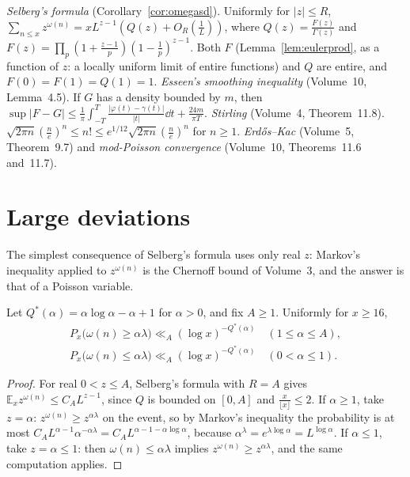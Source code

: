 \begin{reminder}
\emph{Selberg's formula} (Corollary~\ref{cor:omegasd}). Uniformly for $|z|\le R$, $\sum_{n\le x}z^{\omega(n)}=xL^{z-1}(Q(z)+O_R(\frac1L))$, where $Q(z)=\frac{F(z)}{\Gamma(z)}$ and $F(z)=\prod_p(1+\frac{z-1}p)(1-\frac1p)^{z-1}$. Both $F$ (Lemma~\ref{lem:eulerprod}, as a function of $z$: a locally uniform limit of entire functions) and $Q$ are entire, and $F(0)=F(1)=Q(1)=1$.
\emph{Esseen's smoothing inequality} (Volume~10, Lemma~4.5). If $G$ has a density bounded by $m$, then $\sup|F-G|\le\frac1\pi\int_{-T}^T\frac{|\varphi(t)-\gamma(t)|}{|t|}\dd t+\frac{24m}{\pi T}$.
\emph{Stirling} (Volume~4, Theorem~11.8). $\sqrt{2\pi n}(\frac ne)^n\le n!\le e^{1/12}\sqrt{2\pi n}(\frac ne)^n$ for $n\ge1$.
\emph{Erd\H{o}s--Kac} (Volume~5, Theorem~9.7) and \emph{mod-Poisson convergence} (Volume~10, Theorems~11.6 and~11.7).
\end{reminder}

\section{Large deviations}

The simplest consequence of Selberg's formula uses only real $z$: Markov's inequality applied to $z^{\omega(n)}$ is the Chernoff bound of Volume~3, and the answer is that of a Poisson variable.

\begin{proposition}\label{prop:chernoffomega}
Let $Q^*(\alpha)=\alpha\log\alpha-\alpha+1$ for $\alpha>0$, and fix $A\ge1$. Uniformly for $x\ge16$,
\[
\begin{gathered}P_x\bigl(\omega(n)\ge\alpha\lambda\bigr)\ll_A(\log x)^{-Q^*(\alpha)}\quad(1\le\alpha\le A),\\P_x\bigl(\omega(n)\le\alpha\lambda\bigr)\ll_A(\log x)^{-Q^*(\alpha)}\quad(0<\alpha\le1).\end{gathered}
\]
\end{proposition}
\begin{proof}
For real $0<z\le A$, Selberg's formula with $R=A$ gives $\mathbb E_xz^{\omega(n)}\le C_AL^{z-1}$, since $Q$ is bounded on $[0,A]$ and $\frac x{\lfloor x\rfloor}\le2$. If $\alpha\ge1$, take $z=\alpha$: $z^{\omega(n)}\ge z^{\alpha\lambda}$ on the event, so by Markov's inequality the probability is at most $C_AL^{\alpha-1}\alpha^{-\alpha\lambda}=C_AL^{\alpha-1-\alpha\log\alpha}$, because $\alpha^{\lambda}=e^{\lambda\log\alpha}=L^{\log\alpha}$. If $\alpha\le1$, take $z=\alpha\le1$: then $\omega(n)\le\alpha\lambda$ implies $z^{\omega(n)}\ge z^{\alpha\lambda}$, and the same computation applies.
\end{proof}

